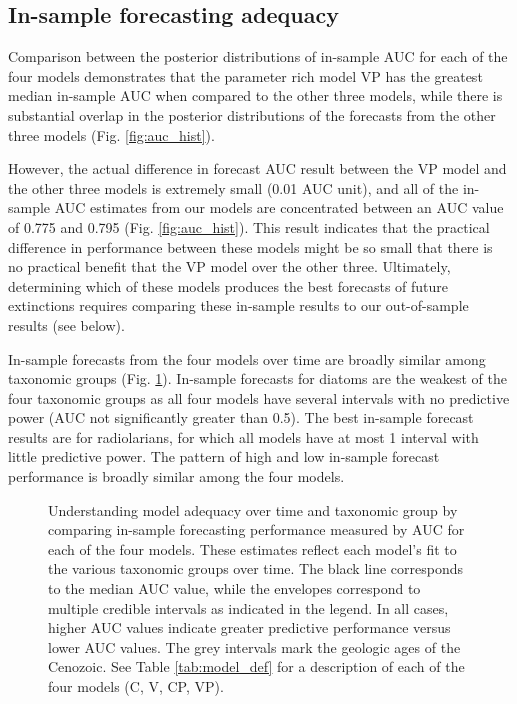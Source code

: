 \documentclass[12pt,letterpaper]{article}
\begin{document}
\begin{refsection}
\subsection{In-sample forecasting adequacy}

Comparison between the posterior distributions of in-sample AUC for each of the four models demonstrates that the parameter rich model VP has the greatest median in-sample AUC when compared to the other three models, while there is substantial overlap in the posterior distributions of the forecasts from the other three models (Fig. \ref{fig:auc_hist}). 

However, the actual difference in forecast AUC result between the VP model and the other three models is extremely small (0.01 AUC unit), and all of the in-sample AUC estimates from our models are concentrated between an AUC value of 0.775 and 0.795 (Fig. \ref{fig:auc_hist}). This result indicates that the practical difference in performance between these models might be so small that there is no practical benefit that the VP model over the other three. Ultimately, determining which of these models produces the best forecasts of future extinctions requires comparing these in-sample results to our out-of-sample results (see below).

In-sample forecasts from the four models over time are broadly similar among taxonomic groups (Fig. \ref{fig:auc_taxon_time}). In-sample forecasts for diatoms are the weakest of the four taxonomic groups as all four models have several intervals with no predictive power (AUC not significantly greater than 0.5). The best in-sample forecast results are for radiolarians, for which all models have at most 1 interval with little predictive power. The pattern of high and low in-sample forecast performance is broadly similar among the four models.

\begin{figure}[ht]
 \centering
 \caption{Understanding model adequacy over time and taxonomic group by comparing in-sample forecasting performance measured by AUC for each of the four models. These estimates reflect each model's fit to the various taxonomic groups over time. The black line corresponds to the median AUC value, while the envelopes correspond to multiple credible intervals as indicated in the legend. In all cases, higher AUC values indicate greater predictive performance versus lower AUC values. The grey intervals mark the geologic ages of the Cenozoic. See Table \ref{tab:model_def} for a description of each of the four models (C, V, CP, VP).}
 \label{fig:auc_taxon_time}
\end{figure}





\end{refsection}
\end{document}
